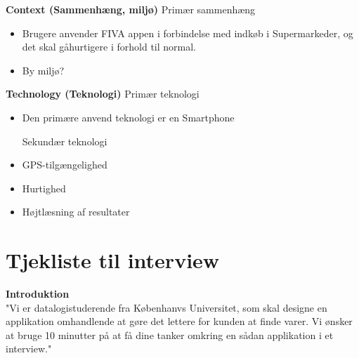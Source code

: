 \documentclass[12pt]{article}
\begin{document}
\textbf{Context (Sammenh\ae ng, milj\o )}
Prim\ae r sammenh\ae ng 
\begin{itemize}
\item Brugere anvender FIVA appen i forbindelse med indk\o b i Supermarkeder, og det skal g\aa hurtigere i forhold til normal.
\item By milj\o  ?
\end{itemize}

\textbf{Technology (Teknologi)}
Prim\ae r teknologi
\begin{itemize}
\item Den prim\ae re anvend teknologi er en Smartphone 

Sekund\ae r teknologi
\item GPS-tilgængelighed
\item Hurtighed
\item Højtlæsning af resultater
\end{itemize}

\newpage

\section{Tjekliste til interview}
\textbf{Introduktion}\\
"Vi er datalogistuderende fra Københanvs Universitet, som skal designe en applikation omhandlende at gøre det lettere for kunden at finde varer. Vi ønsker at bruge 10 minutter på at få dine tanker omkring en sådan applikation  i et interview."
 
\end{document}
